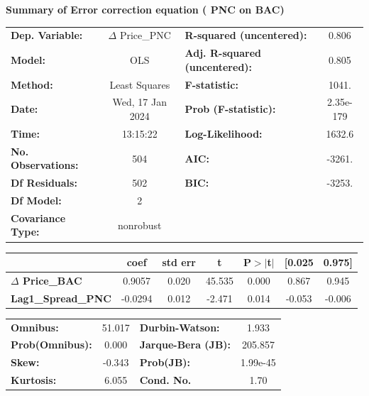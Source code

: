 \documentclass[a4paper, 11pt]{article}
\begin{document}
\begin{enumerate}[A.]
\textbf{Summary of Error correction equation ( PNC on BAC)} 
\begin{center}
\begin{tabular}{lclc}
\toprule
\textbf{Dep. Variable:}    &   $\Delta$ Price\_PNC    & \textbf{  R-squared (uncentered):}      &     0.806   \\
\textbf{Model:}            &       OLS        & \textbf{  Adj. R-squared (uncentered):} &     0.805   \\
\textbf{Method:}           &  Least Squares   & \textbf{  F-statistic:       }          &     1041.   \\
\textbf{Date:}             & Wed, 17 Jan 2024 & \textbf{  Prob (F-statistic):}          & 2.35e-179   \\
\textbf{Time:}             &     13:15:22     & \textbf{  Log-Likelihood:    }          &    1632.6   \\
\textbf{No. Observations:} &         504      & \textbf{  AIC:               }          &    -3261.   \\
\textbf{Df Residuals:}     &         502      & \textbf{  BIC:               }          &    -3253.   \\
\textbf{Df Model:}         &           2      & \textbf{                     }          &             \\
\textbf{Covariance Type:}  &    nonrobust     & \textbf{                     }          &             \\
\bottomrule
\end{tabular}
\begin{tabular}{lcccccc}
                           & \textbf{coef} & \textbf{std err} & \textbf{t} & \textbf{P$> |$t$|$} & \textbf{[0.025} & \textbf{0.975]}  \\
\midrule
\textbf{$\Delta$ Price\_BAC}       &       0.9057  &        0.020     &    45.535  &         0.000        &        0.867    &        0.945     \\
\textbf{Lag1\_Spread\_PNC} &      -0.0294  &        0.012     &    -2.471  &         0.014        &       -0.053    &       -0.006     \\
\bottomrule
\end{tabular}
\begin{tabular}{lclc}
\textbf{Omnibus:}       & 51.017 & \textbf{  Durbin-Watson:     } &    1.933  \\
\textbf{Prob(Omnibus):} &  0.000 & \textbf{  Jarque-Bera (JB):  } &  205.857  \\
\textbf{Skew:}          & -0.343 & \textbf{  Prob(JB):          } & 1.99e-45  \\
\textbf{Kurtosis:}      &  6.055 & \textbf{  Cond. No.          } &     1.70  \\
\bottomrule
\end{tabular}
\end{center}


\end{enumerate}
\end{document}
